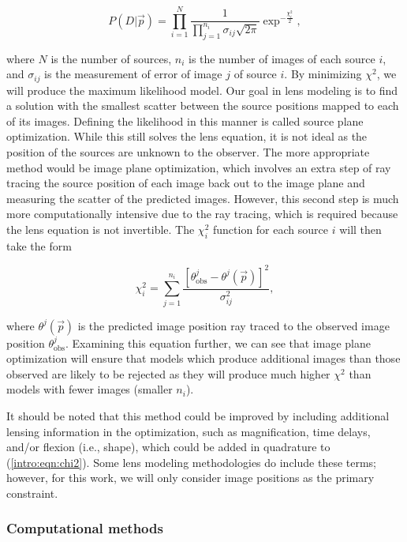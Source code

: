 \begin{equation}
P(D | \vec{p} ) = \prod_{i=1}^N \frac{1}{  \prod_{j=1}^{n_i} \sigma_{ij} \sqrt{2\pi} } \exp^{-\frac{\chi_i^2}{2}},
\label{intro:eqn:likelihood}
\end{equation}

\noindent where $N$ is the number of sources, $n_i$ is the number of images of each source $i$, and $\sigma_{ij}$ is the measurement of error of image $j$ of source $i$. By minimizing $\chi^2$, we will produce the maximum likelihood model. Our goal in lens modeling is to find a solution with the smallest scatter between the source positions mapped to each of its images. Defining the likelihood in this manner is called source plane optimization. While this still solves the lens equation, it is not ideal as the position of the sources are unknown to the observer. The more appropriate method would be image plane optimization, which involves an extra step of ray tracing the source position of each image back out to the image plane and measuring the scatter of the predicted images. However, this second step is much more computationally intensive due to the ray tracing, which is required because the lens equation is not invertible. The $\chi_i^2$ function for each source $i$ will then take the form

\begin{equation}
\chi^2_i = \sum_{j=1}^{n_i} \frac{[\theta_\mathrm{obs}^j - \theta^j (\vec{p})]^2}{\sigma_{ij}^2},
\label{intro:eqn:chi2}
\end{equation}

\noindent where $\theta^j (\vec{p})$ is the predicted image position ray traced to the observed image position $\theta_\mathrm{obs}^j$. Examining this equation further, we can see that image plane optimization will ensure that models which produce additional images than those observed are likely to be rejected as they will produce much higher $\chi^2$ than models with fewer images (smaller $n_i$).

It should be noted that this method could be improved by including additional lensing information in the optimization, such as magnification, time delays, and/or flexion (i.e., shape), which could be added in quadrature to (\ref{intro:eqn:chi2}). Some lens modeling methodologies do include these terms; however, for this work, we will only consider image positions as the primary constraint.

\subsubsection{Computational methods}

